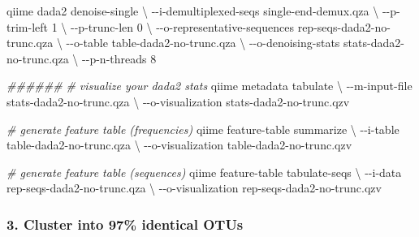 \documentclass[
]{article}
\newenvironment{Shaded}{\begin{snugshade}}{\end{snugshade}}
\newcommand{\AttributeTok}[1]{\textcolor[rgb]{0.77,0.63,0.00}{#1}}
\newcommand{\CommentTok}[1]{\textcolor[rgb]{0.56,0.35,0.01}{\textit{#1}}}
\newcommand{\DataTypeTok}[1]{\textcolor[rgb]{0.13,0.29,0.53}{#1}}
\newcommand{\ExtensionTok}[1]{#1}
\newcommand{\NormalTok}[1]{#1}
\begin{document}
\begin{Shaded}
\begin{Highlighting}[]
\ExtensionTok{qiime}\NormalTok{ dada2 denoise{-}single }\DataTypeTok{\textbackslash{}}
  \AttributeTok{{-}{-}i{-}demultiplexed{-}seqs}\NormalTok{ single{-}end{-}demux.qza }\DataTypeTok{\textbackslash{}}
  \AttributeTok{{-}{-}p{-}trim{-}left}\NormalTok{ 1 }\DataTypeTok{\textbackslash{}}
  \AttributeTok{{-}{-}p{-}trunc{-}len}\NormalTok{ 0 }\DataTypeTok{\textbackslash{}}
  \AttributeTok{{-}{-}o{-}representative{-}sequences}\NormalTok{ rep{-}seqs{-}dada2{-}no{-}trunc.qza }\DataTypeTok{\textbackslash{}}
  \AttributeTok{{-}{-}o{-}table}\NormalTok{ table{-}dada2{-}no{-}trunc.qza }\DataTypeTok{\textbackslash{}}
  \AttributeTok{{-}{-}o{-}denoising{-}stats}\NormalTok{ stats{-}dada2{-}no{-}trunc.qza }\DataTypeTok{\textbackslash{}}
  \AttributeTok{{-}{-}p{-}n{-}threads}\NormalTok{ 8 }
  
\CommentTok{\#\#\#\#\#\#}
\CommentTok{\# visualize your dada2 stats}
\ExtensionTok{qiime}\NormalTok{ metadata tabulate }\DataTypeTok{\textbackslash{}}
  \AttributeTok{{-}{-}m{-}input{-}file}\NormalTok{ stats{-}dada2{-}no{-}trunc.qza }\DataTypeTok{\textbackslash{}}
  \AttributeTok{{-}{-}o{-}visualization}\NormalTok{ stats{-}dada2{-}no{-}trunc.qzv}

\CommentTok{\# generate feature table (frequencies)}
\ExtensionTok{qiime}\NormalTok{ feature{-}table summarize }\DataTypeTok{\textbackslash{}}
  \AttributeTok{{-}{-}i{-}table}\NormalTok{ table{-}dada2{-}no{-}trunc.qza }\DataTypeTok{\textbackslash{}}
  \AttributeTok{{-}{-}o{-}visualization}\NormalTok{ table{-}dada2{-}no{-}trunc.qzv}

\CommentTok{\# generate feature table (sequences)}
\ExtensionTok{qiime}\NormalTok{ feature{-}table tabulate{-}seqs }\DataTypeTok{\textbackslash{}}
  \AttributeTok{{-}{-}i{-}data}\NormalTok{ rep{-}seqs{-}dada2{-}no{-}trunc.qza }\DataTypeTok{\textbackslash{}}
  \AttributeTok{{-}{-}o{-}visualization}\NormalTok{ rep{-}seqs{-}dada2{-}no{-}trunc.qzv }
\end{Highlighting}
\end{Shaded}

\hypertarget{cluster-into-97-identical-otus}{%
\subsubsection{3. Cluster into 97\% identical
OTUs}\label{cluster-into-97-identical-otus}}
\end{document}
